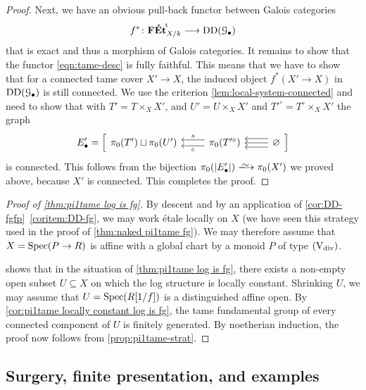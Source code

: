 \begin{proof}
Next, we have an obvious pull-back functor between Galois categories
\begin{equation} \label{eqn:tame-desc}
    f^*\colon {\mathbf{F\acute{E}t}}^{\!\mathrm{t}}_{X/k} \longrightarrow \operatorname{DD}({\mathcal G}_\bullet)
\end{equation}
that is exact and thus a morphism of Galois categories. It remains to show that 
the functor \eqref{eqn:tame-desc} is fully faithful. This means that we have to show that for a connected tame cover $X' \to X$, the induced object $f^*(X'\to X)$ in $\operatorname{DD}({\mathcal G}_\bullet)$ is still connected. We use the criterion \cref{lem:local-system-connected} and need to show that with $T' = T \times_X X'$, and $U' = U \times_X X'$ and $T'^\circ = T^\circ \times_X X'$ the graph
\[
E'_\bullet = \Big[\begin{tikzcd}
        \pi_0(T') \sqcup \pi_0(U') & \ar[l,"c",shift left=0.7ex] \ar[l,"s",swap,shift right=0.7ex] \pi_0(T'^\circ) & \ar[l,shift left=1ex] \ar[l,shift right=1ex] \ar[l] \varnothing  
    \end{tikzcd}\Big]
\]
is connected. This follows from the bijection $\pi_0(|E'_\bullet|) \isomto  \pi_0(X')$
we proved above, because $X'$ is connected. This completes the proof. 
\end{proof}

\begin{proof}[Proof of \cref{thm:pi1tame log is fg}]
By descent \cite[Proposition~4.2.4]{AHLS-Log} and by an application of \cref{cor:DD-fgfp}~\ref{coritem:DD-fg}, we may work \'etale locally on $X$ (we have seen this strategy used in the proof of \cref{thm:naked pi1tame fg}). We may therefore assume that $X=\operatorname{Spec}(P \to R)$ is affine with a global chart by a monoid $P$ of type $(\mathrm{V}_{\rm div})$.

 shows that in the situation of \cref{thm:pi1tame log is fg}, there exists a non-empty open subset $U\subseteq X$ on which the log structure is locally constant. Shrinking $U$, we may assume that $U=\operatorname{Spec}(R[1/f])$ is a distinguished affine open. By \cref{cor:pi1tame locally constant log is fg}, the tame fundamental group of every connected component of $U$ is finitely generated. By noetherian induction, the proof now follows from \cref{prop:pi1tame-strat}.
\end{proof}


\subsection{Surgery, finite presentation, and examples}
\label{ss:surgery}

